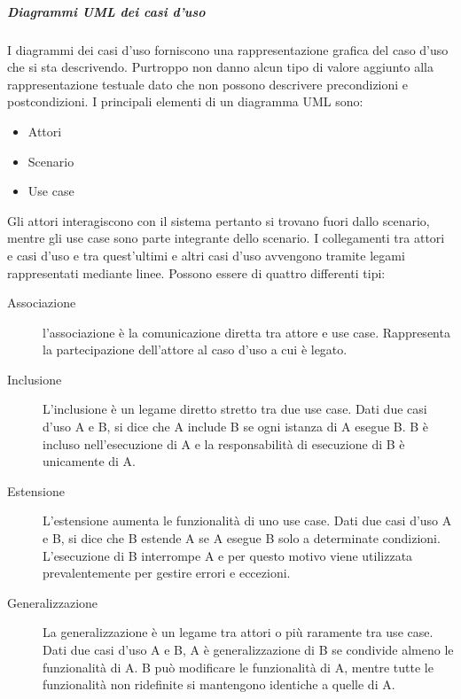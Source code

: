 \documentclass[../norme-di-progetto.tex]{subfiles}
\begin{document}
\subparagraph{Diagrammi UML dei casi d'uso}%
\label{subp:diagrammi_UML_dei_casi_d'uso}
I diagrammi dei casi d'uso forniscono una rappresentazione grafica del caso d'uso che si sta descrivendo. Purtroppo non danno alcun tipo di valore aggiunto alla rappresentazione testuale dato che non possono descrivere precondizioni e postcondizioni. I principali elementi di un diagramma UML sono:
\begin{itemize}
  \item Attori
  \item Scenario
  \item Use case
\end{itemize}
Gli attori interagiscono con il sistema pertanto si trovano fuori dallo scenario, mentre gli use case sono parte integrante dello scenario. I collegamenti tra attori e casi d'uso e tra quest'ultimi e altri casi d'uso avvengono tramite legami rappresentati mediante linee. Possono essere di quattro differenti tipi:
\begin{description}
  \item [Associazione] l'associazione è la comunicazione diretta tra attore e use case. Rappresenta la partecipazione dell'attore al caso d'uso a cui è legato.
  \item [Inclusione] L'inclusione è un legame diretto stretto tra due use case. Dati due casi d'uso A e B, si dice che A include B se ogni istanza di A esegue B. B è incluso nell'esecuzione di A e la responsabilità di esecuzione di B è unicamente di A.
  \item [Estensione] L'estensione aumenta le funzionalità di uno use case. Dati due casi d'uso A e B, si dice che B estende A se A esegue B solo a determinate condizioni. L'esecuzione di B interrompe A e per questo motivo viene utilizzata prevalentemente per gestire errori e eccezioni.
  \item [Generalizzazione] La generalizzazione è un legame tra attori o più raramente tra use case. Dati due casi d'uso A e B, A è generalizzazione di B se condivide almeno le funzionalità di A. B può modificare le funzionalità di A, mentre tutte le funzionalità non ridefinite si mantengono identiche a quelle di A.
\end{description}
\end{document}
